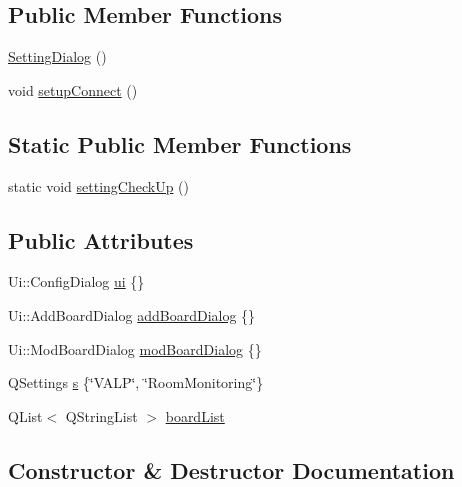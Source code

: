 \subsection*{Public Member Functions}
\begin{DoxyCompactItemize}
\item 
\hyperlink{class_setting_dialog_a7b58286dae412485bcf5344ab129d8b2}{Setting\+Dialog} ()
\item 
void \hyperlink{class_setting_dialog_ab65b6073c77660f4b30c51132c90e320}{setup\+Connect} ()
\end{DoxyCompactItemize}
\subsection*{Static Public Member Functions}
\begin{DoxyCompactItemize}
\item 
static void \hyperlink{class_setting_dialog_a518a4582b5e8837449b71c9af6e0a8b8}{setting\+Check\+Up} ()
\end{DoxyCompactItemize}
\subsection*{Public Attributes}
\begin{DoxyCompactItemize}
\item 
Ui\+::\+Config\+Dialog \hyperlink{class_setting_dialog_a1b223a4d8a30f6766047b2feb4f0656a}{ui} \{\}
\item 
Ui\+::\+Add\+Board\+Dialog \hyperlink{class_setting_dialog_a4d8761a715292f8900d96b17d26814ad}{add\+Board\+Dialog} \{\}
\item 
Ui\+::\+Mod\+Board\+Dialog \hyperlink{class_setting_dialog_afceb552be4d94b1ec42952ae82cc4533}{mod\+Board\+Dialog} \{\}
\item 
Q\+Settings \hyperlink{class_setting_dialog_a1aa2c73ba5349592d93b4cf943f71f81}{s} \{\char`\"{}V\+A\+LP\char`\"{}, \char`\"{}Room\+Monitoring\char`\"{}\}
\item 
Q\+List$<$ Q\+String\+List $>$ \hyperlink{class_setting_dialog_a81ccb4bb14f79aa8c5ea4bb9101b76ea}{board\+List}
\end{DoxyCompactItemize}


\subsection{Constructor \& Destructor Documentation}
\mbox{\label{class_setting_dialog_a7b58286dae412485bcf5344ab129d8b2}} 
